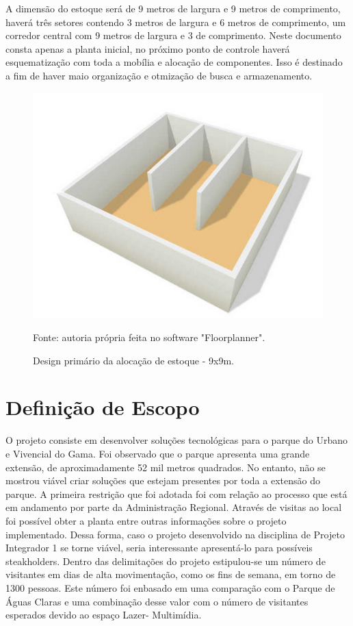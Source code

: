 	A dimensão do estoque será de 9 metros de largura e 9 metros de comprimento, haverá três setores contendo 3 metros de largura e 6 metros de comprimento, um corredor central com 9 metros de largura e 3 de comprimento. Neste documento consta apenas a planta inicial, no próximo ponto de controle haverá esquematização com toda a mobília e alocação de componentes. Isso é destinado a fim de haver maio organização e otmização de busca e armazenamento.

\begin{figure}[H]
	 \centering
	\label{Design primário da alocação de estoque - 9x9m}
	 \includegraphics[keepaspectratio=true,scale=0.8]{figuras/figuraxdesign.png}
	 \caption{Design primário da alocação de estoque - 9x9m.}
	 \small{Fonte: autoria própria feita no software "Floorplanner".}
\end{figure}


\section{Definição de Escopo}

	O projeto consiste em desenvolver soluções tecnológicas para o parque do Urbano e Vivencial do Gama. Foi observado que o parque apresenta uma grande extensão, de aproximadamente 52 mil metros quadrados. No entanto, não se mostrou viável criar soluções que estejam presentes por toda a extensão do parque. A primeira restrição que foi adotada foi com relação ao processo que está em andamento por parte da Administração Regional. Através de visitas ao local foi possível obter a planta entre outras informações sobre o projeto implementado. Dessa forma, caso o projeto desenvolvido na disciplina de Projeto Integrador 1 se torne viável, seria interessante apresentá-lo para possíveis steakholders. 
	Dentro das delimitações do projeto estipulou-se um número de visitantes em dias de alta movimentação, como os fins de semana, em torno de 1300 pessoas. Este número foi enbasado em uma comparação com o Parque de Águas Claras e uma combinação desse valor com o número de visitantes esperados devido ao espaço Lazer- Multimídia. 

